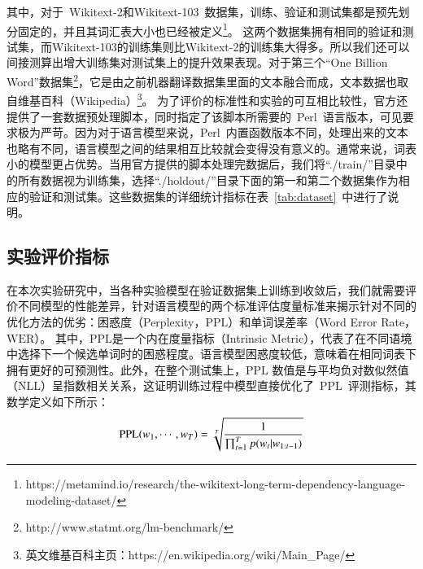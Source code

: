 其中，对于~Wikitext-2和Wikitext-103~数据集，训练、验证和测试集都是预先划分固定的，并且其词汇表大小也已经被定义\footnote{https://metamind.io/research/the-wikitext-long-term-dependency-language-modeling-dataset/}。
这两个数据集拥有相同的验证和测试集，而Wikitext-103的训练集则比Wikitext-2的训练集大得多。所以我们还可以间接测算出增大训练集对测试集上的提升效果表现。对于第三个``One Billion Word''数据集\footnote{http://www.statmt.org/lm-benchmark/}，它是由之前机器翻译数据集里面的文本融合而成，文本数据也取自维基百科（Wikipedia）\footnote{英文维基百科主页：https://en.wikipedia.org/wiki/Main\_Page/}。
为了评价的标准性和实验的可互相比较性，官方还提供了一套数据预处理脚本，同时指定了该脚本所需要的~Perl~语言版本，可见要求极为严苛。因为对于语言模型来说，Perl~内置函数版本不同，处理出来的文本也略有不同，语言模型之间的结果相互比较就会变得没有意义的。通常来说，词表小的模型更占优势。当用官方提供的脚本处理完数据后，我们将``./train/''目录中的所有数据视为训练集，选择``./holdout/''目录下面的第一和第二个数据集作为相应的验证和测试集。这些数据集的详细统计指标在表~\ref{tab:dataset}~中进行了说明。

\subsection{实验评价指标}
在本次实验研究中，当各种实验模型在验证数据集上训练到收敛后，我们就需要评价不同模型的性能差异，针对语言模型的两个标准评估度量标准来揭示针对不同的优化方法的优劣：困惑度（Perplexity，$ \mathrm{PPL} $）和单词误差率（Word Error Rate，$\mathrm{WER} $）。
其中，$ \mathrm{PPL} $是一个内在度量指标（Intrinsic Metric），代表了在不同语境中选择下一个候选单词时的困惑程度。语言模型困惑度较低，意味着在相同词表下拥有更好的可预测性。此外，在整个测试集上，$\mathrm{PPL}$ 数值是与平均负对数似然值（NLL）呈指数相关关系，这证明训练过程中模型直接优化了~$ \mathrm{PPL} $~评测指标，其数学定义如下所示：
\begin{equation}\label{equ:ppl}
\setlength{\abovedisplayskip}{6pt}
\setlength{\belowdisplayskip}{6pt}
   \mathrm{PPL}(w_1,\cdots,w_T)=\sqrt[T]{\frac{1}{\prod_{t=1}^T p(w_t|w_{1:t-1})}}
\end{equation}

